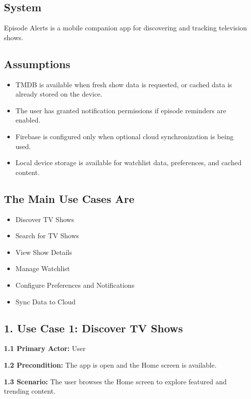 \subsection*{System}
Episode Alerts is a mobile companion app for discovering and tracking television shows.

\subsection*{Assumptions}
\begin{itemize}
	\item TMDB is available when fresh show data is requested, or cached data is already stored on the device.
	\item The user has granted notification permissions if episode reminders are enabled.
	\item Firebase is configured only when optional cloud synchronization is being used.
	\item Local device storage is available for watchlist data, preferences, and cached content.
\end{itemize}

\subsection*{The Main Use Cases Are}
\begin{itemize}
	\item Discover TV Shows
	\item Search for TV Shows
	\item View Show Details
	\item Manage Watchlist
	\item Configure Preferences and Notifications
	\item Sync Data to Cloud
\end{itemize}

\subsection*{1. Use Case 1: Discover TV Shows}
\noindent\textbf{1.1 Primary Actor:} User

\noindent\textbf{1.2 Precondition:} The app is open and the Home screen is available.

\noindent\textbf{1.3 Scenario:} The user browses the Home screen to explore featured and trending content.

